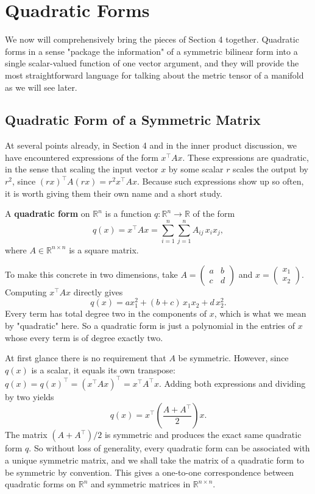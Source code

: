 \documentclass{article}
\begin{document}
\section{Quadratic Forms}
 
We now will comprehensively bring the pieces of Section 4 together. Quadratic forms in a sense "package the information" of a symmetric bilinear form into a single scalar-valued function of one vector argument, and they will provide the most straightforward language for talking about the metric tensor of a manifold as we will see later.
 
\subsection{Quadratic Form of a Symmetric Matrix}
 
At several points already, in Section 4 and in the inner product discussion, we have encountered expressions of the form $x^\top A x$. These expressions are quadratic, in the sense that scaling the input vector $x$ by some scalar $r$ scales the output by $r^2$, since $(rx)^\top A (rx) = r^2 x^\top A x$. Because such expressions show up so often, it is worth giving them their own name and a short study.
 
A \textbf{quadratic form} on $\mathbb{R}^n$ is a function $q: \mathbb{R}^n \to \mathbb{R}$ of the form
$$q(x) = x^\top A x = \sum_{i=1}^n \sum_{j=1}^n A_{ij}\, x_i x_j,$$
where $A \in \mathbb{R}^{n \times n}$ is a square matrix.
 
To make this concrete in two dimensions, take $A = \begin{pmatrix} a & b \\ c & d \end{pmatrix}$ and $x = \begin{pmatrix} x_1 \\ x_2\end{pmatrix}$. Computing $x^\top A x$ directly gives
$$q(x) = a x_1^2 + (b + c)\, x_1 x_2 + d\, x_2^2.$$
Every term has total degree two in the components of $x$, which is what we mean by "quadratic" here. So a quadratic form is just a polynomial in the entries of $x$ whose every term is of degree exactly two.
 
At first glance there is no requirement that $A$ be symmetric. However, since $q(x)$ is a scalar, it equals its own transpose: $q(x) = q(x)^\top = (x^\top A x)^\top = x^\top A^\top x$. Adding both expressions and dividing by two yields
$$q(x) = x^\top \left( \frac{A + A^\top}{2}\right) x.$$
The matrix $(A + A^\top)/2$ is symmetric and produces the exact same quadratic form $q$. So without loss of generality, every quadratic form can be associated with a unique symmetric matrix, and we shall take the matrix of a quadratic form to be symmetric by convention. This gives a one-to-one correspondence between quadratic forms on $\mathbb{R}^n$ and symmetric matrices in $\mathbb{R}^{n \times n}$.
 
\end{document}
